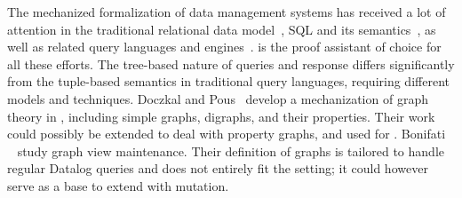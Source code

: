The mechanized formalization of data management systems has received a lot of attention in the traditional relational data model~\cite{relationalcoq}, SQL and its semantics~\cite{sqlequiv, hottsql, vesqlengines, vesqlsemantics}, as well as related query languages and engines~\cite{certifdatalog, qcert}. \coq is the proof assistant of choice for all these efforts. The tree-based nature of \gql queries and response differs significantly from the tuple-based semantics in traditional query languages, requiring different models and techniques.
Doczkal and Pous~\cite{graphtheory} develop a mechanization of graph theory in \coq, including simple graphs, digraphs, and their properties. Their work could possibly be extended to deal with property graphs, and used for \gcoql.
Bonifati \etal~\cite{graphviewmaint} study graph view maintenance. Their definition of graphs is tailored to handle regular Datalog queries and does not entirely fit the \gql setting; it could however serve as a base to extend \gcoql with mutation.



